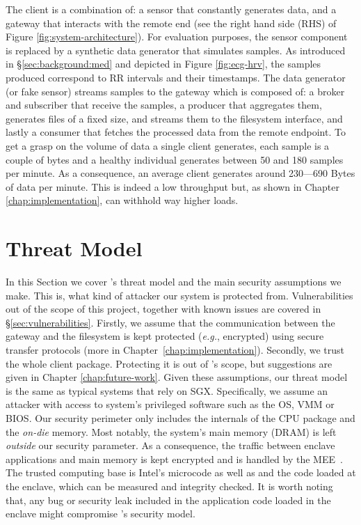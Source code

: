 The client is a combination of: a sensor that constantly generates data, and a gateway that interacts with the remote end (see the right hand side (RHS) of Figure \ref{fig:system-architecture}). 
For evaluation purposes, the sensor component is replaced by a synthetic data generator that simulates samples.
As introduced in \S\ref{sec:background:med} and depicted in Figure \ref{fig:ecg-hrv}, the samples produced correspond to RR intervals and their timestamps.
The data generator (or fake sensor) streams samples to the gateway which is composed of: a broker and subscriber that receive the samples, a producer that aggregates them, generates files of a fixed size, and streams them to the filesystem interface, and lastly a consumer that fetches the processed data from the remote endpoint. 
To get a grasp on the volume of data a single client generates, each sample is a couple of bytes and a healthy individual generates between 50 and 180 samples per minute.
As a consequence, an average client generates around 230---690 Bytes of data per minute.
This is indeed a low throughput but, as shown in Chapter \ref{chap:implementation}, \projName can withhold way higher loads.

\section{Threat Model} \label{sec:threat}

In this Section we cover \projName's threat model and the main security assumptions we make.
This is, what kind of attacker our system is protected from.
Vulnerabilities out of the scope of this project, together with known issues are covered in \S\ref{sec:vulnerabilities}.
Firstly, we assume that the communication between the gateway and the filesystem is kept protected (\emph{e.g.}, encrypted) using secure transfer protocols (more in Chapter~\ref{chap:implementation}).
Secondly, we trust the whole client package.
Protecting it is out of \projName's scope, but suggestions are given in Chapter \ref{chap:future-work}.
Given these assumptions, our threat model is the same as typical systems that rely on \textsc{SGX}. 
Specifically, we assume an attacker with access to system's privileged software such as the OS, VMM or BIOS.
Our security perimeter only includes the internals of the CPU package and the \textit{on-die} memory.
Most notably, the system's main memory (DRAM) is left \emph{outside} our security parameter.
As a consequence, the traffic between enclave applications and main memory is kept encrypted and is handled by the MEE~\cite{Gueron16}.
The trusted computing base is Intel's microcode as well as and the code loaded at the enclave, which can be measured and integrity checked. 
It is worth noting that, any bug or security leak included in the application code loaded in the enclave might compromise \projName's security model.

